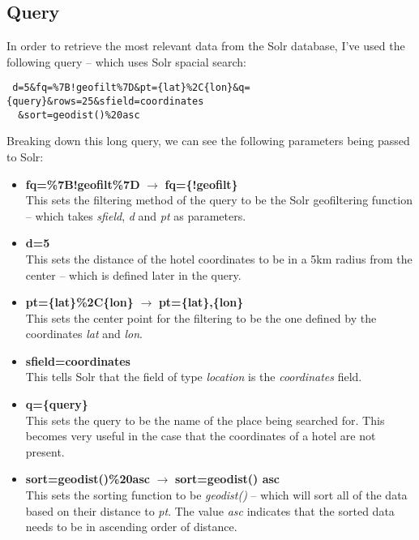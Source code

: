 \documentclass[unicode,11pt,a4paper,oneside,numbers=endperiod,openany]{scrartcl}
\begin{document}
\subsection{Query}
In order to retrieve the most relevant data from the Solr database, I've used the following query -- which uses Solr spacial search:

\begin{verbatim}
 d=5&fq=%7B!geofilt%7D&pt={lat}%2C{lon}&q={query}&rows=25&sfield=coordinates
  &sort=geodist()%20asc
\end{verbatim}
Breaking down this long query, we can see the following parameters being passed to Solr:

\begin{itemize}
	\item \textbf{fq=\%7B!geofilt\%7D} $\rightarrow$ \textbf{fq=\{!geofilt\}}
	\vspace{.2cm} \\
	This sets the filtering method of the query to be the Solr geofiltering function -- which takes \textit{sfield}, \textit{d} and \textit{pt} as parameters.
	
	\item \textbf{d=5}
	\vspace{.2cm} \\
	This sets the distance of the hotel coordinates to be in a 5km radius from the center -- which is defined later in the query.
	
	\item \textbf{pt=\{lat\}\%2C\{lon\}} $\rightarrow$ \textbf{pt=\{lat\},\{lon\}}
	\vspace{.2cm} \\
	This sets the center point for the filtering to be the one defined by the coordinates \textit{lat} and \textit{lon}.
	
	\item \textbf{sfield=coordinates}
	\vspace{.2cm} \\
	This tells Solr that the field of type \textit{location} is the \textit{coordinates} field.
	
	\item \textbf{q=\{query\}}
	\vspace{.2cm} \\
	This sets the query to be the name of the place being searched for. This becomes very useful in the case that the coordinates of a hotel are not present.
	
	\item \textbf{sort=geodist()\%20asc} $\rightarrow$ \textbf{sort=geodist() asc}
	\vspace{.2cm} \\
	This sets the sorting function to be \textit{geodist()} -- which will sort all of the data based on their distance to \textit{pt}. The value \textit{asc} indicates that the sorted data needs to be in ascending order of distance.
\end{itemize}
\end{document}
